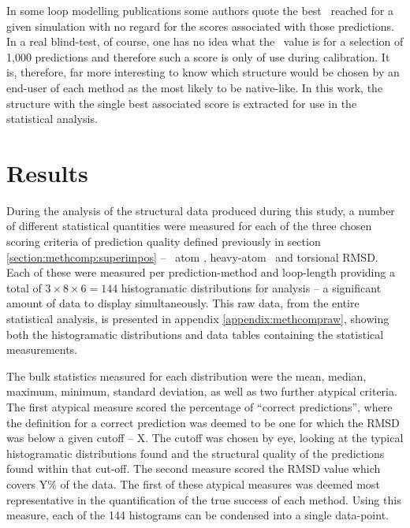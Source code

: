In some loop modelling publications some authors quote the best
\crms\ reached for a given simulation with no regard for the scores associated
with those predictions\cite{METHOD:CLOOP}. In a real blind-test, of course, one has no idea what the \crms\ value is for a selection of 1,000 predictions and therefore such a score is only of use during calibration. It is, therefore, far more interesting to know which structure would be chosen by an end-user of each
method as the most likely to be native-like.
In this work, the structure with the single best associated score is extracted for use in the statistical analysis. 









\section{Results}
\label{section:methcomp:results}


During the analysis of the structural data produced during this study, a number of different statistical quantities were measured for each of the three chosen scoring criteria of prediction quality defined previously in section \ref{section:methcomp:superimpos} -- \mainchain\ atom \crms, heavy-atom \crms\ and torsional RMSD. Each of these were measured per prediction-method and loop-length providing  a total of $3\times8\times6=144$ histogramatic distributions for analysis -- a significant amount of data to display simultaneously.
This raw data, from the entire statistical analysis, is presented in appendix \ref{appendix:methcompraw}, showing both the histogramatic distributions and data tables containing the statistical measurements.


The bulk statistics measured for each distribution were the mean, median, maximum, minimum, standard deviation, as well as two further atypical criteria. The first atypical measure scored the percentage of ``correct predictions'', where the definition for a correct prediction was deemed to be one for which the RMSD was below a given cutoff -- X. The cutoff was chosen by eye, looking at the typical histogramatic distributions found and the structural quality of the  predictions  found within that cut-off. The second measure scored the RMSD value which covers Y\% of the data. The first of these atypical measures was deemed most representative in the quantification of the true success of each method.
Using this measure, each of the 144 histograms can be condensed into a single data-point.

